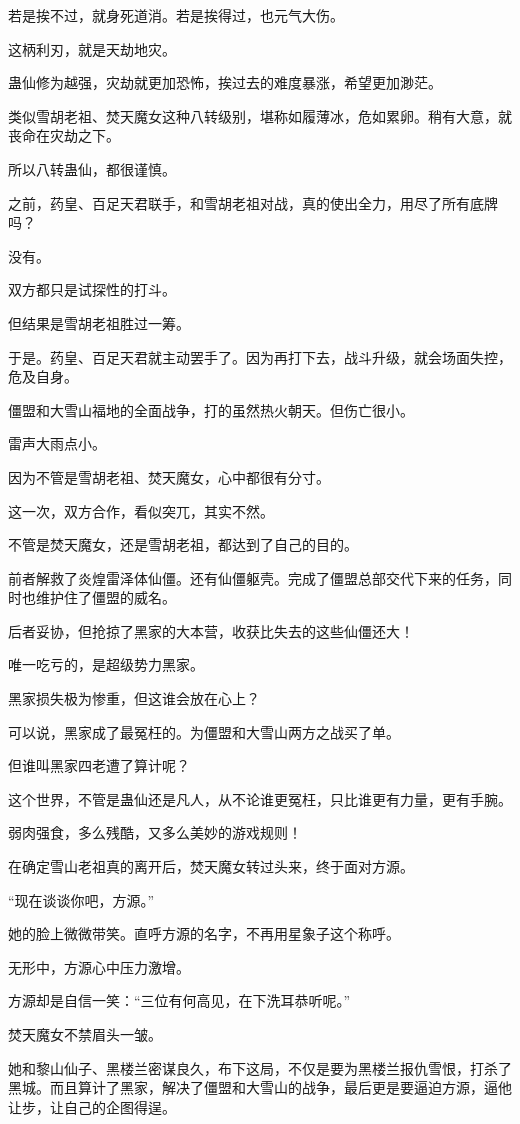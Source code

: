 \begin{this_body}
若是挨不过，就身死道消。若是挨得过，也元气大伤。

这柄利刃，就是天劫地灾。

蛊仙修为越强，灾劫就更加恐怖，挨过去的难度暴涨，希望更加渺茫。

类似雪胡老祖、焚天魔女这种八转级别，堪称如履薄冰，危如累卵。稍有大意，就丧命在灾劫之下。

所以八转蛊仙，都很谨慎。

之前，药皇、百足天君联手，和雪胡老祖对战，真的使出全力，用尽了所有底牌吗？

没有。

双方都只是试探性的打斗。

但结果是雪胡老祖胜过一筹。

于是。药皇、百足天君就主动罢手了。因为再打下去，战斗升级，就会场面失控，危及自身。

僵盟和大雪山福地的全面战争，打的虽然热火朝天。但伤亡很小。

雷声大雨点小。

因为不管是雪胡老祖、焚天魔女，心中都很有分寸。

这一次，双方合作，看似突兀，其实不然。

不管是焚天魔女，还是雪胡老祖，都达到了自己的目的。

前者解救了炎煌雷泽体仙僵。还有仙僵躯壳。完成了僵盟总部交代下来的任务，同时也维护住了僵盟的威名。

后者妥协，但抢掠了黑家的大本营，收获比失去的这些仙僵还大！

唯一吃亏的，是超级势力黑家。

黑家损失极为惨重，但这谁会放在心上？

可以说，黑家成了最冤枉的。为僵盟和大雪山两方之战买了单。

但谁叫黑家四老遭了算计呢？

这个世界，不管是蛊仙还是凡人，从不论谁更冤枉，只比谁更有力量，更有手腕。

弱肉强食，多么残酷，又多么美妙的游戏规则！

在确定雪山老祖真的离开后，焚天魔女转过头来，终于面对方源。

“现在谈谈你吧，方源。”

她的脸上微微带笑。直呼方源的名字，不再用星象子这个称呼。

无形中，方源心中压力激增。

方源却是自信一笑：“三位有何高见，在下洗耳恭听呢。”

焚天魔女不禁眉头一皱。

她和黎山仙子、黑楼兰密谋良久，布下这局，不仅是要为黑楼兰报仇雪恨，打杀了黑城。而且算计了黑家，解决了僵盟和大雪山的战争，最后更是要逼迫方源，逼他让步，让自己的企图得逞。


\end{this_body}
